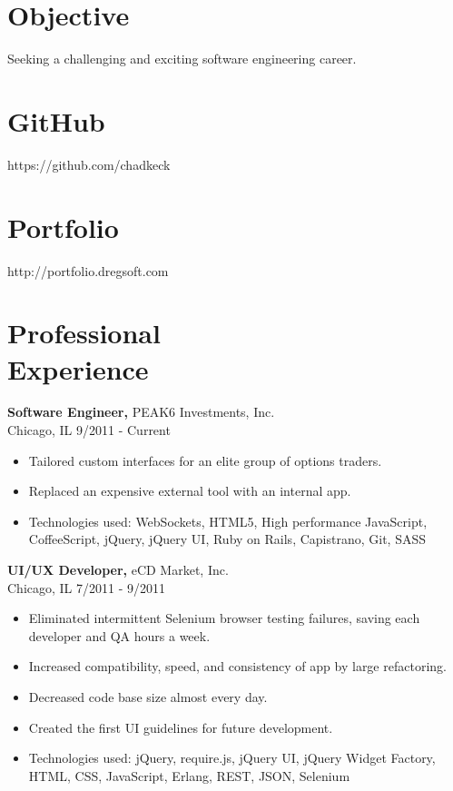 \documentclass[margin]{res}
\begin{document}
 
 
 
\address{{\bf Address} \\ 531 Carlysle Dr. \#7 \\ Clarendon Hills, IL 60514  \\
        (630) 414-8700 }
\address{{\bf } }

\begin{resume} 
 
\section{Objective} 
Seeking a challenging and exciting software engineering career.

\section{GitHub}
https://github.com/chadkeck

\section{Portfolio}
http://portfolio.dregsoft.com

\section{Professional \\ Experience}

{\bf Software Engineer,} PEAK6 Investments, Inc.\\ Chicago, IL \hfill 9/2011 - Current
\begin{itemize} \itemsep -2pt  %
\item Tailored custom interfaces for an elite group of options traders.
\item Replaced an expensive external tool with an internal app.
\item Technologies used: WebSockets, HTML5, High performance JavaScript, CoffeeScript, jQuery, jQuery UI, Ruby on Rails, Capistrano, Git, SASS
\end{itemize}

{\bf UI/UX Developer,} eCD Market, Inc.\\ Chicago, IL \hfill 7/2011 - 9/2011
\begin{itemize} \itemsep -2pt  %
\item Eliminated intermittent Selenium browser testing failures, saving each developer and QA hours a week.
\item Increased compatibility, speed, and consistency of app by large refactoring.
\item Decreased code base size almost every day.
\item Created the first UI guidelines for future development.
\item Technologies used: jQuery, require.js, jQuery UI, jQuery Widget Factory, HTML, CSS, JavaScript, Erlang, REST, JSON, Selenium
\end{itemize}


\end{resume}
\end{document}
